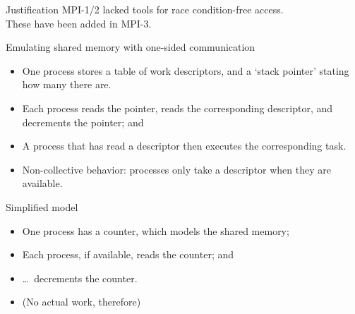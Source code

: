 
\begin{numberedframe}{Justification}
  MPI-1/2 lacked tools for race condition-free access.\\
  These have been added in MPI-3.
\end{numberedframe}

\begin{numberedframe}{Emulating shared memory with one-sided communication}
  \begin{itemize}
  \item One process stores a table of work descriptors, and a `stack pointer'
    stating how many there are.
  \item Each process reads the pointer, reads the corresponding
    descriptor, and decrements the pointer; and
  \item A process that has read a descriptor then executes the
    corresponding task.
  \item Non-collective behavior: processes only take a descriptor when they are available.
  \end{itemize}
\end{numberedframe}

\begin{numberedframe}{Simplified model}
  \begin{itemize}
  \item One process has a counter, which models the shared memory;
  \item Each process, if available, reads the counter; and
  \item \ldots~decrements the counter.
  \item (No actual work, therefore)
  \end{itemize}
\end{numberedframe}

